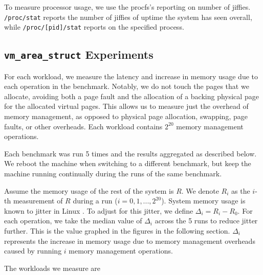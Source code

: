 \documentclass[twocolumn,11pt]{article}
\begin{document}
To measure processor usage, we use the procfs's reporting on number of jiffies.
\texttt{/proc/stat} reports the number of jiffies of uptime the system has seen
overall, while \texttt{/proc/[pid]/stat} reports on the specified process.

\subsection{\texttt{vm\_area\_struct} Experiments}
\label{ss_vm_area_struct}

For each workload, we measure the latency and increase in memory usage due to
each operation in the benchmark. Notably, we do not touch the pages that we
allocate, avoiding both a page fault and the allocation of a backing physical page
for the allocated virtual pages. This allows us to measure just the overhead of
memory management, as opposed to physical page allocation, swapping, page
faults, or other overheads.  Each workload contains $2^{20}$ memory management
operations.

Each benchmark was run 5 times and the results aggregated as described below. We
reboot the machine when switching to a different benchmark, but keep the machine
running continually during the runs of the same benchmark. 

Assume the memory usage of the rest of the system is $R$. We denote $R_i$ as the
$i$-th measurement of $R$ during a run ($i = 0, 1, ..., 2^{20}$). System memory
usage is known to jitter in Linux \cite{jitter}. To adjust for this jitter, we
define $\Delta_i = R_i - R_0$. For each operation, we take the median value of
$\Delta_i$ across the 5 runs to reduce jitter further.  This is the value
graphed in the figures in the following section. $\Delta_i$ represents the
increase in memory usage due to memory management overheads caused by running
$i$ memory management operations.

The workloads we measure are
\end{document}
